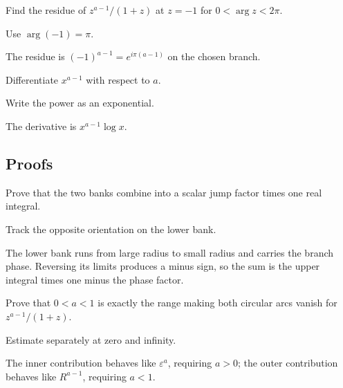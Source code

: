 \begin{exercise}\label{exr:iv21-expand-04}
Find the residue of \(z^{a-1}/(1+z)\) at \(z=-1\) for \(0<\arg z<2\pi\).
\end{exercise}
\begin{hint}
Use \(\arg(-1)=\pi\).
\end{hint}
\begin{solution}
The residue is \((-1)^{a-1}=e^{i\pi(a-1)}\) on the chosen branch.
\end{solution}

\begin{exercise}\label{exr:iv21-expand-05}
Differentiate \(x^{a-1}\) with respect to \(a\).
\end{exercise}
\begin{hint}
Write the power as an exponential.
\end{hint}
\begin{solution}
The derivative is \(x^{a-1}\log x\).
\end{solution}

\subsection*{Proofs}

\begin{exercise}\label{exr:iv21-expand-06}
Prove that the two banks combine into a scalar jump factor times one real integral.
\end{exercise}
\begin{hint}
Track the opposite orientation on the lower bank.
\end{hint}
\begin{solution}
The lower bank runs from large radius to small radius and carries the branch phase. Reversing its limits produces a minus sign, so the sum is the upper integral times one minus the phase factor.
\end{solution}

\begin{exercise}\label{exr:iv21-expand-07}
Prove that \(0<a<1\) is exactly the range making both circular arcs vanish for \(z^{a-1}/(1+z)\).
\end{exercise}
\begin{hint}
Estimate separately at zero and infinity.
\end{hint}
\begin{solution}
The inner contribution behaves like \(\varepsilon^a\), requiring \(a>0\); the outer contribution behaves like \(R^{a-1}\), requiring \(a<1\).
\end{solution}

